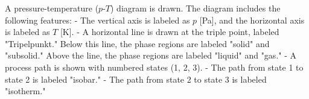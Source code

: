 A pressure-temperature (\( p \)-\( T \)) diagram is drawn. The diagram includes the following features:  
- The vertical axis is labeled as \( p \) [Pa], and the horizontal axis is labeled as \( T \) [K].  
- A horizontal line is drawn at the triple point, labeled "Tripelpunkt." Below this line, the phase regions are labeled "solid" and "subsolid." Above the line, the phase regions are labeled "liquid" and "gas."  
- A process path is shown with numbered states (1, 2, 3).  
  - The path from state 1 to state 2 is labeled "isobar."  
  - The path from state 2 to state 3 is labeled "isotherm."